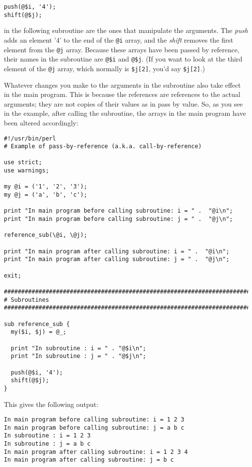 \begin{lstlisting}
push(@$i, '4');
shift(@$j);
\end{lstlisting}

in the following subroutine are the ones that manipulate the arguments.  The \textit{push} adds an element '4' to the end of the \verb|@i| array, and the \textit{shift} removes the first element from the \verb|@j| array. Because these arrays have been passed by reference, their names in the subroutine are \verb|@$i| and \verb|@$j|. (If you want to look at the third element of the \verb|@j| array, which normally is \verb|$j[2]|, you'd say \verb|$j[2]|.)

Whatever changes you make to the arguments in the subroutine also take effect in the main program. This is because the references are references to the actual arguments; they are not copies of their values as in pass by value. So, as you see in the example, after calling the subroutine, the arrays in the main program have been altered accordingly:

\begin{lstlisting}
#!/usr/bin/perl
# Example of pass-by-reference (a.k.a. call-by-reference)

use strict;
use warnings;

my @i = ('1', '2', '3');
my @j = ('a', 'b', 'c');

print "In main program before calling subroutine: i = " .  "@i\n";
print "In main program before calling subroutine: j = " .  "@j\n";

reference_sub(\@i, \@j);

print "In main program after calling subroutine: i = " .  "@i\n";
print "In main program after calling subroutine: j = " .  "@j\n";

exit;

################################################################################
# Subroutines
################################################################################

sub reference_sub {
  my($i, $j) = @_;

  print "In subroutine : i = " . "@$i\n";
  print "In subroutine : j = " . "@$j\n";

  push(@$i, '4');
  shift(@$j);
}
\end{lstlisting}

This gives the following output:

\begin{lstlisting}
In main program before calling subroutine: i = 1 2 3
In main program before calling subroutine: j = a b c
In subroutine : i = 1 2 3
In subroutine : j = a b c
In main program after calling subroutine: i = 1 2 3 4
In main program after calling subroutine: j = b c
\end{lstlisting}

